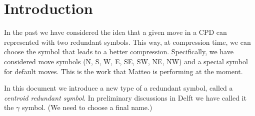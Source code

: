 \section{Introduction}

In the past we have considered the idea that a given move in a CPD can represented with two redundant symbols.
This way, at compression time, we can choose the symbol that leads to a better compression.
Specifically, we have considered move symbols (N, S, W, E, SE, SW, NE, NW) and a special symbol for default moves.
This is the work that Matteo is performing at the moment.

In this document we introduce a new type of a redundant symbol, called a \emph{centroid redundant symbol}.
In preliminary discussions in Delft we have called it the $\gamma$ symbol. 
(We need to choose a final name.)
